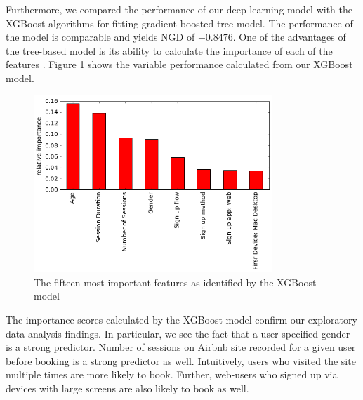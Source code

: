 \documentclass[12pt]{article}
\begin{document}
Furthermore, we compared the performance of our deep learning model with the XGBoost algorithms \citep{chenG16} for fitting gradient boosted tree model. The performance of the model is comparable and yields NGD of $-0.8476$. One of the advantages of the tree-based model is its  ability to calculate the importance of each of the features \citep{hastie_elements_2016}. Figure \ref{fig:xgd_imp} shows the variable performance calculated from our XGBoost model.
\begin{figure}[h!]
	\centering
	\includegraphics[width=0.8\textwidth]{feature_importance_xgb}
	\caption{The fifteen most important features as identified by the XGBoost model}
	\label{fig:xgd_imp}
\end{figure}

The importance scores calculated by the  XGBoost model confirm our exploratory data analysis findings. In particular, we see the fact that a user specified gender is a strong predictor. Number of sessions on Airbnb site recorded for a given user before booking is a strong predictor as well. Intuitively, users who visited the site multiple times are more likely to book. Further,  web-users who signed up via devices with large screens are also likely to book as well.
\end{document}
